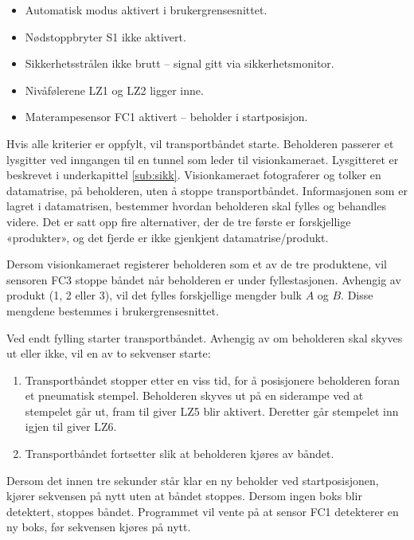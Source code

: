 \documentclass[Visionprosjekt.tex]{subfiles}
\begin{document}
\begin{itemize}
    \item Automatisk modus aktivert i brukergrensesnittet.
    \item Nødstoppbryter S1 ikke aktivert.
    \item Sikkerhetsstrålen ikke brutt -- signal gitt via sikkerhetsmonitor.
    \item Nivåfølerene LZ1 og LZ2 ligger inne.
    \item Materampesensor FC1 aktivert -- beholder i startposisjon.
\end{itemize}
Hvis  alle kriterier er oppfylt, vil transportbåndet starte. Beholderen passerer et lysgitter ved inngangen til en tunnel som leder til visionkameraet. Lysgitteret er beskrevet i underkapittel \ref{sub:sikk}. Visionkameraet fotograferer og tolker en datamatrise, på beholderen, uten å stoppe transportbåndet. Informasjonen som er lagret i datamatrisen, bestemmer  hvordan beholderen skal fylles og behandles videre. Det er satt opp fire alternativer, der de tre første er forskjellige «produkter», og det fjerde er  ikke gjenkjent datamatrise/produkt.

Dersom visionkameraet registerer beholderen som et av de tre produktene, vil sensoren FC3 stoppe båndet når beholderen er under fyllestasjonen. Avhengig av produkt (1, 2 eller 3), vil det fylles forskjellige mengder bulk $A$ og $B$. Disse mengdene bestemmes i brukergrensesnittet. 
 
Ved endt fylling starter transportbåndet. Avhengig av om beholderen skal skyves ut eller ikke, vil en av to sekvenser starte:
 
\begin{enumerate}
     \item Transportbåndet stopper etter en viss tid, for å posisjonere beholderen foran et pneumatisk stempel. %
    Beholderen skyves ut på en siderampe ved at stempelet går ut, fram til giver LZ5 blir aktivert. Deretter går stempelet inn igjen til giver LZ6.
     \item Transportbåndet fortsetter slik at beholderen kjøres av båndet. 
\end{enumerate}

Dersom det innen tre sekunder står klar en ny beholder ved startposisjonen, kjører sekvensen på nytt uten at båndet stoppes. Dersom ingen boks blir detektert,  stoppes båndet. Programmet vil vente på at sensor FC1  detekterer en ny boks, før sekvensen kjøres på nytt. %
\end{document}
